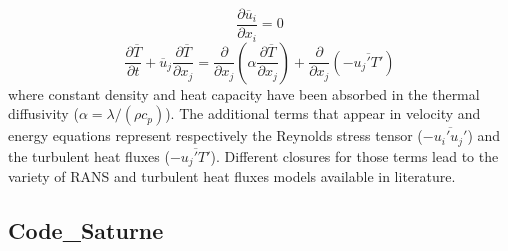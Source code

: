 \documentclass[11pt,letterpaper,english]{article}
\begin{document}
\begin{equation}
\frac{\partial \overline{u}_i}{\partial x_i} = 0
\label{rhoEqnRANS}
\end{equation}
\begin{equation}
 \frac{\partial \overline{T} }{\partial t} + \overline{u}_j \frac{\partial \overline{T}}{\partial x_j}  = \frac{\partial }{\partial x_j} \left( \alpha \frac{\partial \overline{T}}{\partial x_j} \right) +\frac{\partial}{\partial x_j} \left( -\overline{u_j' T'}\right)
\label{EEqnRANS}
\end{equation}
where constant density and heat capacity have been absorbed in the thermal diffusivity ($\alpha = \lambda / (\rho c_p)$). The additional terms that appear in velocity and energy equations represent respectively the Reynolds stress tensor ($-\overline{u_i' u_j'} $) and the turbulent heat fluxes ($ -\overline{u_j' T'}$). Different closures for those terms lead to the variety of RANS and turbulent heat fluxes models available in literature.

\subsection{Code_Saturne}
\end{document}

